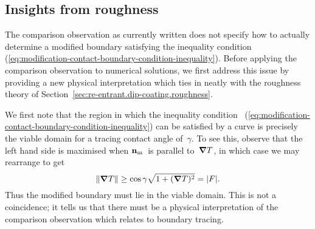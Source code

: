 \subsection{Insights from roughness}
\label{sec:small.modification.insights}

The comparison observation as currently written
does not specify how to actually determine a modified boundary
satisfying the inequality condition~%
  (\ref{eq:modification-contact-boundary-condition-inequality}).
Before applying the comparison observation to numerical solutions,
we first address this issue
by providing a new physical interpretation
which ties in neatly with the roughness theory
of Section~\ref{sec:re-entrant.dip-coating.roughness}.

We first note that the region in which the inequality condition~%
  (\ref{eq:modification-contact-boundary-condition-inequality})
can be satisfied by a curve
is precisely the viable domain for a tracing contact angle of~$\gamma$.
To see this, observe that the left hand side is maximised
when $\mathop{}\!\boldsymbol{\mathbf{n}}_{\mathrm{m}}$~is parallel to~$\mathop{}\!\boldsymbol{\mathbf{\nabla}} T$,
in which case we may rearrange to get
\[
  \lVert\mathop{}\!\boldsymbol{\mathbf{\nabla}} T\rVert \ge \cos\gamma \sqrt{1 + (\mathop{}\!\boldsymbol{\mathbf{\nabla}} T)^2} = \lvert F\rvert.
\]
Thus the modified boundary must lie in the viable domain.
This is not a coincidence;
it tells us that there must be
a physical interpretation of the comparison observation
which relates to boundary tracing.

